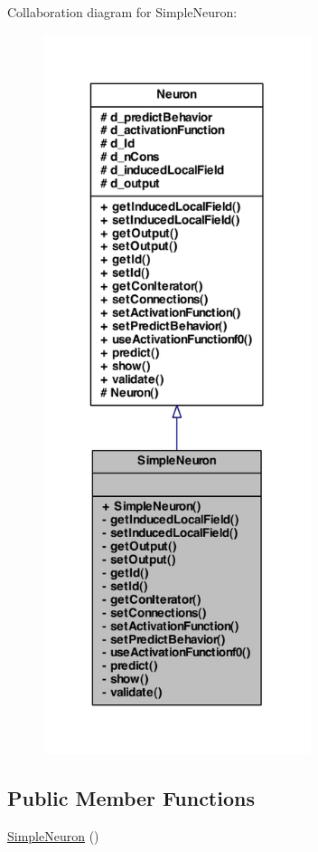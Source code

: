 Collaboration diagram for SimpleNeuron:
\nopagebreak
\begin{figure}[H]
\begin{center}
\leavevmode
\includegraphics[width=222pt]{class_simple_neuron__coll__graph}
\end{center}
\end{figure}
\subsection*{Public Member Functions}
\begin{DoxyCompactItemize}
\item 
\hyperlink{class_simple_neuron_a38c2d75287caf6374c1252c35f73dce2}{SimpleNeuron} ()
\end{DoxyCompactItemize}
